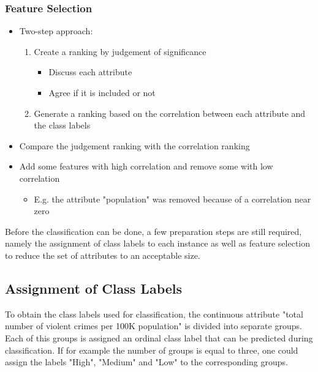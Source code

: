 \begin{frame}
  \frametitle{Feature Selection}
  \onslide<+->
  \begin {itemize}
    \item<+-> Two-step approach:
      \begin{enumerate}
        \item<+-> Create a ranking by judgement of significance
          \begin{itemize}
            \item<+-> Discuss each attribute
            \item<+-> Agree if it is included or not
          \end{itemize}
        \item<+-> Generate a ranking based on the correlation between each attribute and the class labels
      \end{enumerate}
    \item<+-> Compare the judgement ranking with the correlation ranking
    \item<+-> Add some features with high correlation and remove some with low correlation
      \begin{itemize}
        \item<+-> E.g. the attribute "population" was removed because of a correlation near zero
      \end{itemize}
  \end{itemize}
\end{frame}


Before the classification can be done, a few preparation steps are still
required, namely the assignment of class labels to each instance as
well as feature selection to reduce the set of attributes to an
acceptable size.

\subsection{Assignment of Class Labels}
\label{sec:assignment}

To obtain the class labels used for classification, the
continuous attribute "total number of violent crimes per 100K
population" is divided into separate groups. Each of this groups is
assigned an ordinal class label that can be predicted during classification.
If for example the number of groups is equal to three, one could
assign the labels "High", "Medium" and "Low" to the corresponding
groups.

